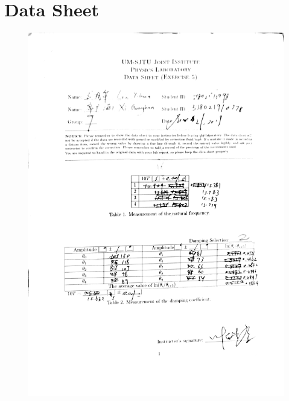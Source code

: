 \documentclass[a4paper]{report}
\begin{document}
	\section{Data Sheet}
	\begin{figure}[H]
		\centering
		\includegraphics[width=1\linewidth]{10.jpg}
	\end{figure}
\end{document}
